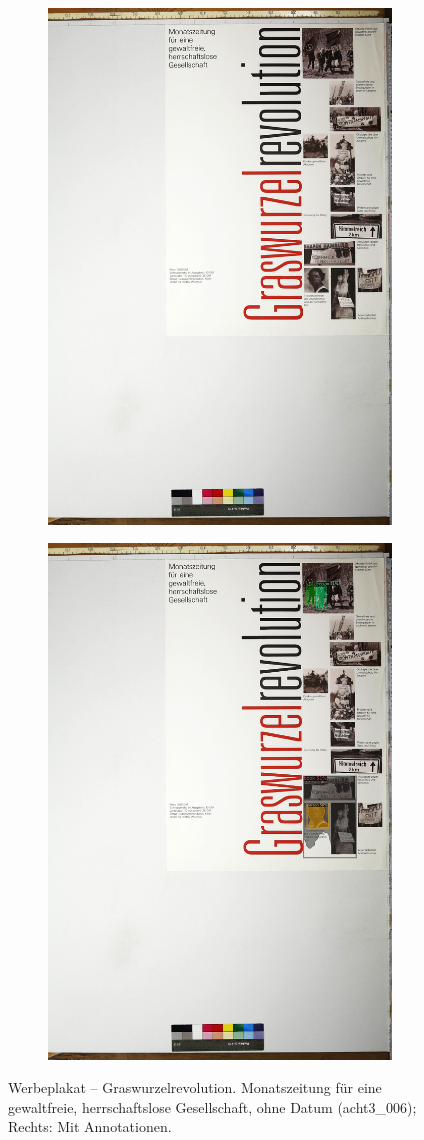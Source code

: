 \documentclass[a4paper,12pt,ngerman]{article}
\begin{document}
\newpage
\begin{landscape}
\begin{figure}[ht]
	\begin{subfigure}[b]{0.5\linewidth}
	\centering
	\includegraphics[height=\linewidth]{Abbildung_41_(acht3_006)}
	\end{subfigure}
	\begin{subfigure}[b]{0.5\linewidth}
	\centering
	\includegraphics[height=\linewidth]{Abbildung_41_(acht3_006)_with_detections}
	\end{subfigure}
	\caption{Werbeplakat – Graswurzelrevolution. Monatszeitung für eine gewaltfreie, herrschaftslose Gesellschaft, ohne Datum (acht3\_006); Rechts: Mit Annotationen.}
\end{figure}
\end{landscape}
\end{document}

